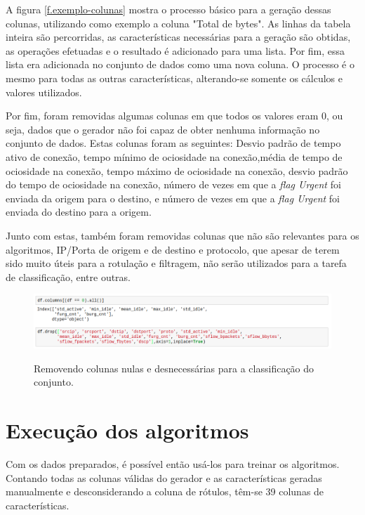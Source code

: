 A figura \ref{f.exemplo-colunas} mostra o processo básico para a geração dessas colunas, utilizando como exemplo a coluna "Total de bytes". As linhas da tabela inteira são percorridas, as características necessárias para a geração são obtidas, as operações efetuadas e o resultado é adicionado para uma lista. Por fim, essa lista era adicionada no conjunto de dados como uma nova coluna. O processo é o mesmo para todas as outras características, alterando-se somente os cálculos e valores utilizados.

Por fim, foram removidas algumas colunas em que todos os valores eram 0, ou seja, dados que o gerador não foi capaz de obter nenhuma informação no conjunto de dados. Estas colunas foram as seguintes: Desvio padrão de tempo ativo de conexão, tempo mínimo de ociosidade na conexão,média de tempo de ociosidade na conexão, tempo máximo de ociosidade na conexão, desvio padrão do tempo de ociosidade na conexão, número de vezes em que a \textit{flag Urgent} foi enviada da origem para o destino, e número de vezes em que a \textit{flag Urgent}  foi enviada do destino para a origem.

Junto com estas, também foram removidas colunas que não são relevantes para os algoritmos, IP/Porta de origem e de destino e protocolo, que apesar de terem sido muito úteis para a rotulação e filtragem, não serão utilizados para a tarefa de classificação, entre outras.

\begin{figure}[h]
\caption{\small Removendo colunas nulas e desnecessárias para a classificação do conjunto.}
\centering
\includegraphics[scale=0.40]{figs/drop-colunas.png}
\label{f.drop-colunas}
\end{figure}

\section{Execução dos algoritmos}

Com os dados preparados, é possível então usá-los para treinar os algoritmos. Contando todas as colunas válidas do gerador e as características geradas manualmente e desconsiderando a coluna de rótulos, têm-se 39 colunas de características.

